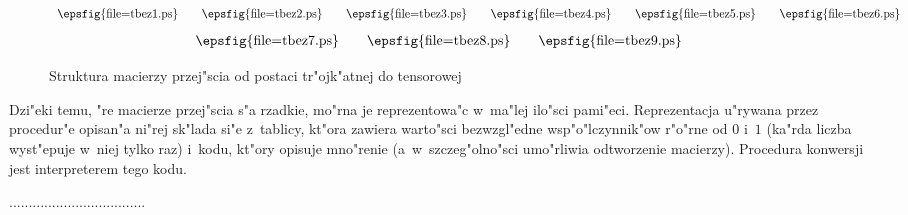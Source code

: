 \begin{figure}[h]
  \[
    \begin{array}{c}\mbox{\epsfig{file=tbez1.ps}}\end{array}\quad
    \begin{array}{c}\mbox{\epsfig{file=tbez2.ps}}\end{array}\quad
    \begin{array}{c}\mbox{\epsfig{file=tbez3.ps}}\end{array}\quad
    \begin{array}{c}\mbox{\epsfig{file=tbez4.ps}}\end{array}\quad
    \begin{array}{c}\mbox{\epsfig{file=tbez5.ps}}\end{array}\quad
    \begin{array}{c}\mbox{\epsfig{file=tbez6.ps}}\end{array}
  \]
  \[
    \begin{array}{c}\mbox{\epsfig{file=tbez7.ps}}\end{array}\quad
    \begin{array}{c}\mbox{\epsfig{file=tbez8.ps}}\end{array}\quad
    \begin{array}{c}\mbox{\epsfig{file=tbez9.ps}}\end{array}
  \]
  \caption{\label{fig:trconv:mat}Struktura macierzy przej"scia od postaci
    tr"ojk"atnej do tensorowej}
\end{figure}
Dzi"eki temu, "re macierze przej"scia s"a rzadkie, mo"rna je reprezentowa"c
w~ma"lej ilo"sci pami"eci. Reprezentacja u"rywana przez procedur"e opisan"a
ni"rej sk"lada si"e z~tablicy, kt"ora zawiera warto"sci bezwzgl"edne
wsp"o"lczynnik"ow r"o"rne od $0$ i~$1$ (ka"rda liczba wyst"epuje w~niej
tylko raz) i~kodu, kt"ory opisuje mno"renie (a~w~szcze\-g"ol\-no"s\-ci
umo"rliwia odtworzenie macierzy). Procedura konwersji jest interpreterem
tego kodu.

\vspace{\bigskipamount}

...................................

